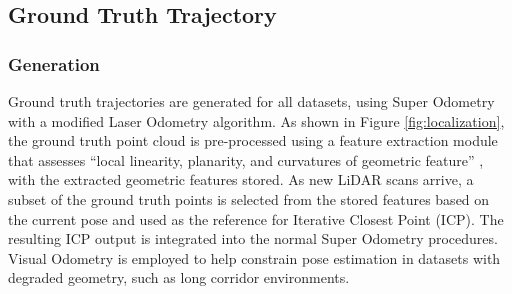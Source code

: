 \documentclass[10pt,twocolumn,letterpaper]{article}
\begin{document}

\subsection{Ground Truth Trajectory}
\subsubsection{Generation}
Ground truth trajectories are generated for all datasets, using Super Odometry \cite{zhao2021super} with a modified Laser Odometry algorithm. As shown in Figure \ref{fig:localization}, the ground truth point cloud is pre-processed using a feature extraction module that assesses ``local linearity, planarity, and curvatures of geometric feature'' \cite{zhao2021super}, with the extracted geometric features stored. As new LiDAR scans arrive, a subset of the ground truth points is selected from the stored features based on the current pose and used as the reference for Iterative Closest Point (ICP). The resulting ICP output is integrated into the normal Super Odometry procedures. Visual Odometry is employed to help constrain pose estimation in datasets with degraded geometry, such as long corridor environments.

\end{document}

